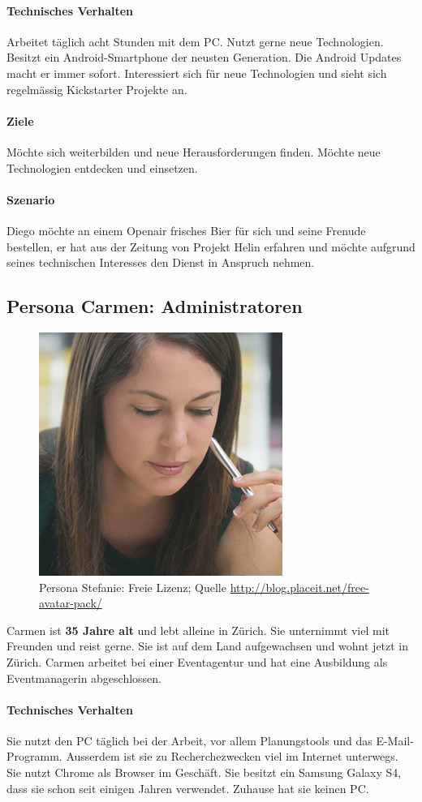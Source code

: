 \paragraph{Technisches Verhalten}
Arbeitet täglich acht Stunden mit dem PC. Nutzt gerne neue Technologien. Besitzt ein Android-Smartphone der neusten Generation. Die Android Updates macht er immer sofort. Interessiert sich für neue Technologien und sieht sich regelmässig Kickstarter Projekte an.
\paragraph{Ziele}
Möchte sich weiterbilden und neue Herausforderungen finden. Möchte neue Technologien entdecken und einsetzen.
\paragraph{Szenario}
Diego möchte an einem Openair frisches Bier für sich und seine Frenude bestellen, er hat aus der Zeitung von Projekt Helin erfahren und möchte aufgrund seines technischen Interesses den Dienst in Anspruch nehmen.
\subsection{Persona Carmen: Administratoren}
\begin{figure}[h]
\centering
	\includegraphics[width=.35\textwidth]{images/persona-stefanie.jpg}
	\caption{Persona Stefanie: Freie Lizenz; Quelle
	 \protect\url{http://blog.placeit.net/free-avatar-pack/}}
	\label{fig:stefanie}
\end{figure}
Carmen ist \textbf{35 Jahre alt} und lebt alleine in Zürich.
Sie unternimmt viel mit Freunden und reist gerne. Sie ist auf dem Land aufgewachsen und wohnt jetzt in Zürich.
Carmen arbeitet bei einer Eventagentur und hat eine Ausbildung als Eventmanagerin abgeschlossen.

\paragraph{Technisches Verhalten}
Sie nutzt den PC täglich bei der Arbeit, vor allem Planungstools und das E-Mail-Programm. Ausserdem ist sie zu Recherchezwecken viel im Internet unterwegs. Sie nutzt Chrome als Browser im Geschäft. Sie besitzt ein Samsung Galaxy S4, dass sie schon seit einigen Jahren verwendet. Zuhause hat sie keinen PC.
